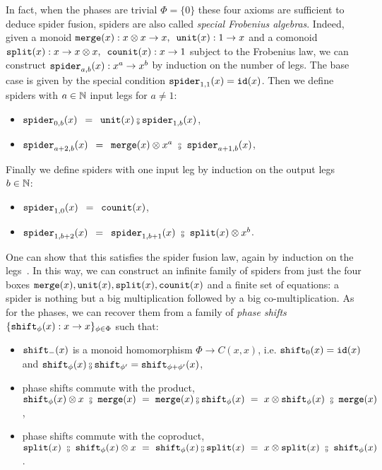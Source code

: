In fact, when the phases are trivial $\Phi = \{ 0 \}$ these four axioms are sufficient to deduce spider fusion, spiders are also called \emph{special Frobenius algebras}.
Indeed, given a monoid $\mathtt{merge}(x) : x \otimes x \to x, \enspace \mathtt{unit}(x) : 1 \to x$ and a comonoid $\mathtt{split}(x) : x \to x \otimes x, \enspace \mathtt{counit}(x) : x \to 1$ subject to the Frobenius law, we can construct $\mathtt{spider}_{a, b}(x) : x^a \to x^b$ by induction on the number of legs.
The base case is given by the special condition $\mathtt{spider}_{1, 1}(x) = \mathtt{id}(x)$.
Then we define spiders with $a \in \mathbb{N}$ input legs for $a \neq 1$:
\begin{itemize}
\item $\spider_{0, b}(x) \s = \s \unit(x) \fcmp \spider_{1, b}(x)$,
\item $\spider_{a + 2, b}(x) \s = \s \merge(x) \otimes x^a \ \fcmp \ \spider_{a + 1, b}(x)$,
\end{itemize}
\begin{center}
\hfill
{}
\end{center}
Finally we define spiders with one input leg by induction on the output legs $b \in \mathbb{N}$:
\begin{itemize}
\item $\mathtt{spider}_{1, 0}(x) \enspace = \enspace \mathtt{counit}(x)$,
\item $\spider_{1, b + 2}(x) \s = \s \spider_{1, b + 1}(x) \ \fcmp \ \ttsplit(x) \otimes x^b$.
\end{itemize}
One can show that this satisfies the spider fusion law, again by induction on the legs~\cite[Lemma 5.20]{HeunenVicary19a}.
In this way, we can construct an infinite family of spiders from just the four boxes $\mathtt{merge}(x), \mathtt{unit}(x), \mathtt{split}(x), \mathtt{counit}(x)$ and a finite set of equations: a spider is nothing but a big multiplication followed by a big co-multiplication.
As for the phases, we can recover them from a family of \emph{phase shifts} $\{ \mathtt{shift}_\phi(x) : x \to x \}_{\phi \in \Phi}$ such that:
\begin{itemize}
\item $\mathtt{shift}_-(x)$ is a monoid homomorphism $\Phi \to C(x, x)$, i.e. $\mathtt{shift}_0(x) = \mathtt{id}(x)$ and $\shift_{\phi}(x) \fcmp \shift_{\phi'} = \shift_{\phi + \phi'}(x)$,
\item phase shifts commute with the product, $\shift_\phi(x) \otimes x \ \fcmp \ \merge(x)
\ = \ \merge(x) \fcmp \shift_\phi(x)
\ = \ x \otimes \shift_\phi(x) \ \fcmp \ \merge(x)$,
\item phase shifts commute with the coproduct, $\ttsplit(x) \ \fcmp \ \shift_\phi(x) \otimes x
\ = \ \shift_\phi(x) \fcmp \ttsplit(x)
\ = \ x \otimes \ttsplit(x) \ \fcmp \ \shift_\phi(x)$.
\end{itemize}
